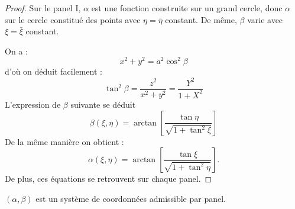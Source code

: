 \begin{proof}
Sur le panel I, $\alpha$ est une fonction construite sur un grand cercle, donc $\alpha$ sur le cercle constitué des points avec $\eta=\bar{\eta}$ constant. De même, $\beta$ varie avec $\xi= \bar{\xi}$ constant. 

On a :
\begin{equation}
x^2 + y^2 = a^2 \cos^2 \beta
\end{equation}
d'où on déduit facilement :
\begin{equation}
\tan^2 \beta = \dfrac{z^2}{x^2+y^2} = \dfrac{Y^2}{1+X^2}
\end{equation}
L'expression de $\beta$ suivante se déduit
\begin{equation}
\beta(\xi, \eta) = \arctan \left[ \dfrac{\tan \eta}{\sqrt{1+\tan^2 \xi}} \right]
\end{equation}
De la même manière on obtient :
\begin{equation}
\alpha(\xi, \eta) = \arctan \left[ \dfrac{\tan \xi}{\sqrt{1+\tan^2 \eta}} \right].
\end{equation}
De plus, ces équations se retrouvent sur chaque panel.
\end{proof}


\begin{theoreme}
$(\alpha, \beta)$ est un système de coordonnées admissible par panel.
\end{theoreme}

